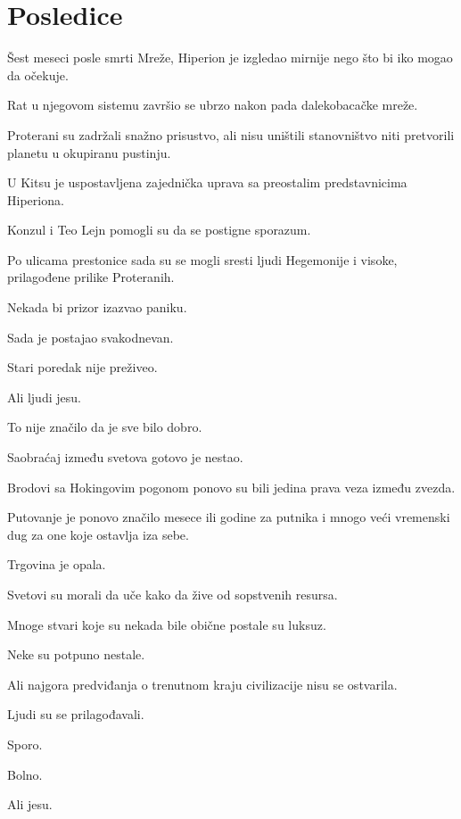 
\chapter{Posledice}


Šest meseci posle smrti Mreže, Hiperion je izgledao mirnije nego što bi iko mogao da očekuje.

Rat u njegovom sistemu završio se ubrzo nakon pada dalekobacačke mreže.

Proterani su zadržali snažno prisustvo, ali nisu uništili stanovništvo niti pretvorili planetu u okupiranu pustinju.

U Kitsu je uspostavljena zajednička uprava sa preostalim predstavnicima Hiperiona.

Konzul i Teo Lejn pomogli su da se postigne sporazum.

Po ulicama prestonice sada su se mogli sresti ljudi Hegemonije i visoke, prilagođene prilike Proteranih.

Nekada bi prizor izazvao paniku.

Sada je postajao svakodnevan.

\bigskip

Stari poredak nije preživeo.

Ali ljudi jesu.

To nije značilo da je sve bilo dobro.

Saobraćaj između svetova gotovo je nestao.

Brodovi sa Hokingovim pogonom ponovo su bili jedina prava veza između zvezda.

Putovanje je ponovo značilo mesece ili godine za putnika i mnogo veći vremenski dug za one koje ostavlja iza sebe.

Trgovina je opala.

Svetovi su morali da uče kako da žive od sopstvenih resursa.

Mnoge stvari koje su nekada bile obične postale su luksuz.

Neke su potpuno nestale.

Ali najgora predviđanja o trenutnom kraju civilizacije nisu se ostvarila.

Ljudi su se prilagođavali.

Sporo.

Bolno.

Ali jesu.

\bigskip

